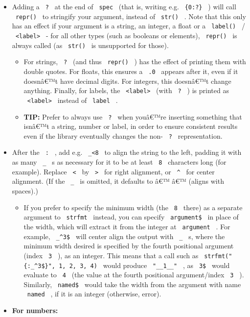 \begin{itemize}
\tightlist
\item
  Adding a \texttt{\ ?\ } at the end of \texttt{\ spec\ } (that is,
  writing e.g. \texttt{\ \{0:?\}\ } ) will call \texttt{\ repr()\ } to
  stringify your argument, instead of \texttt{\ str()\ } . Note that
  this only has an effect if your argument is a string, an integer, a
  float or a \texttt{\ label()\ } /
  \texttt{\ \textless{}label\textgreater{}\ } - for all other types
  (such as booleans or elements), \texttt{\ repr()\ } is always called
  (as \texttt{\ str()\ } is unsupported for those).

  \begin{itemize}
  \tightlist
  \item
    For strings, \texttt{\ ?\ } (and thus \texttt{\ repr()\ } ) has the
    effect of printing them with double quotes. For floats, this ensures
    a \texttt{\ .0\ } appears after it, even if it doesnâ€™t have
    decimal digits. For integers, this doesnâ€™t change anything.
    Finally, for labels, the \texttt{\ \textless{}label\textgreater{}\ }
    (with \texttt{\ ?\ } ) is printed as
    \texttt{\ \textless{}label\textgreater{}\ } instead of
    \texttt{\ label\ } .
  \item
    \textbf{TIP:} Prefer to always use \texttt{\ ?\ } when youâ€™re
    inserting something that isnâ€™t a string, number or label, in order
    to ensure consistent results even if the library eventually changes
    the non- \texttt{\ ?\ } representation.
  \end{itemize}
\item
  After the \texttt{\ :\ } , add e.g. \texttt{\ \_\textless{}8\ } to
  align the string to the left, padding it with as many \texttt{\ \_\ }
  s as necessary for it to be at least \texttt{\ 8\ } characters long
  (for example). Replace \texttt{\ \textless{}\ } by
  \texttt{\ \textgreater{}\ } for right alignment, or \texttt{\ \^{}\ }
  for center alignment. (If the \texttt{\ \_\ } is omitted, it defaults
  to â€™ â€™ (aligns with spaces).)

  \begin{itemize}
  \tightlist
  \item
    If you prefer to specify the minimum width (the \texttt{\ 8\ }
    there) as a separate argument to \texttt{\ strfmt\ } instead, you
    can specify \texttt{\ argument\$\ } in place of the width, which
    will extract it from the integer at \texttt{\ argument\ } . For
    example, \texttt{\ \_\^{}3\$\ } will center align the output with
    \texttt{\ \_\ } s, where the minimum width desired is specified by
    the fourth positional argument (index \texttt{\ 3\ } ), as an
    integer. This means that a call such as
    \texttt{\ strfmt("\{:\_\^{}3\$\}",\ 1,\ 2,\ 3,\ 4)\ } would produce
    \texttt{\ "\_\_1\_\_"\ } , as \texttt{\ 3\$\ } would evaluate to
    \texttt{\ 4\ } (the value at the fourth positional argument/index
    \texttt{\ 3\ } ). Similarly, \texttt{\ named\$\ } would take the
    width from the argument with name \texttt{\ named\ } , if it is an
    integer (otherwise, error).
  \end{itemize}
\item
  \textbf{For numbers:}


\end{itemize}
